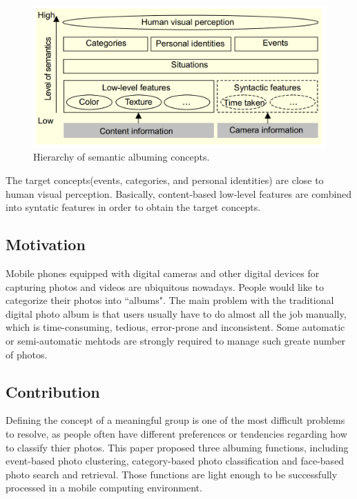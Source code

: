 \documentclass[a4paper]{article}
\begin{document}
        \begin{figure}[!htb] \begin{center}
             \includegraphics[scale=0.3]{hierachy}
             \caption{Hierarchy of semantic albuming concepts.}
        \end{center} \end{figure}

        The target concepts(events, categories, and personal identities) are close to human visual perception. Basically, content-based low-level features are combined into syntatic features in order to obtain the target concepts.

        \subsection{Motivation}
        Mobile phones equipped with digital cameras and other digital devices for capturing photos and videos are ubiquitous nowadays. People would like to categorize their photos into ``albums". The main problem with the traditional digital photo album is that users usually have to do almost all the job manually, which is time-consuming, tedious, error-prone and inconsistent. Some automatic or semi-automatic mehtods are strongly required to manage such greate number of photos.

        \subsection{Contribution}
        Defining the concept of a meaningful group is one of the most difficult problems to resolve, as people often have different preferences or tendencies regarding how to classify thier photos. This paper proposed three albuming functions, including event-based photo clustering, category-based photo classification and face-based photo search and retrieval. Those functions are light enough to be successfully processed in a mobile computing environment.
\end{document}
